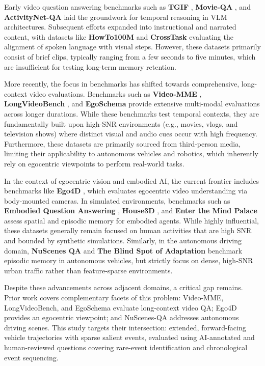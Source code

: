 \documentclass[journal]{IEEEtran}
\begin{document}
Early video question answering benchmarks such as \textbf{TGIF} \cite{tgif}, \textbf{Movie-QA} \cite{movieqa}, and \textbf{ActivityNet-QA} \cite{activitynetqa} laid the groundwork for temporal reasoning in VLM architectures. Subsequent efforts expanded into instructional and narrated content, with datasets like \textbf{HowTo100M} \cite{howto100m} and \textbf{CrossTask} \cite{crosstask} evaluating the alignment of spoken language with visual steps. However, these datasets primarily consist of brief clips, typically ranging from a few seconds to five minutes, which are insufficient for testing long-term memory retention.

More recently, the focus in benchmarks has shifted towards comprehensive, long-context video evaluations. Benchmarks such as \textbf{Video-MME} \cite{videomme}, \textbf{LongVideoBench} \cite{longvideobench}, and \textbf{EgoSchema} \cite{egoschema} provide extensive multi-modal evaluations across longer durations. While these benchmarks test temporal contexts, they are fundamentally built upon high-SNR environments (e.g., movies, vlogs, and television shows) where distinct visual and audio cues occur with high frequency. Furthermore, these datasets are primarily sourced from third-person media, limiting their applicability to autonomous vehicles and robotics, which inherently rely on egocentric viewpoints to perform real-world tasks.

In the context of egocentric vision and embodied AI, the current frontier includes benchmarks like \textbf{Ego4D} \cite{ego4d}, which evaluates egocentric video understanding via body-mounted cameras. In simulated environments, benchmarks such as \textbf{Embodied Question Answering} \cite{embodiedqa}, \textbf{House3D} \cite{house3d}, and \textbf{Enter the Mind Palace} \cite{mindpalace} assess spatial and episodic memory for embodied agents. While highly influential, these datasets generally remain focused on human activities that are high SNR and bounded by synthetic simulations. Similarly, in the autonomous driving domain, \textbf{NuScenes QA} \cite{nuscenesqa} and \textbf{The Blind Spot of Adaptation} \cite{blindspot} benchmark episodic memory in autonomous vehicles, but strictly focus on dense, high-SNR urban traffic rather than feature-sparse environments.

Despite these advancements across adjacent domains, a critical gap remains. Prior work covers complementary facets of this problem: Video-MME, LongVideoBench, and EgoSchema evaluate long-context video QA; Ego4D provides an egocentric viewpoint; and NuScenes-QA addresses autonomous driving scenes. This study targets their intersection: extended, forward-facing vehicle trajectories with sparse salient events, evaluated using AI-annotated and human-reviewed questions covering rare-event identification and chronological event sequencing.
\end{document}
